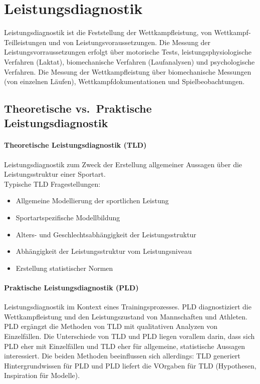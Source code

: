 \section{Leistungsdiagnostik}
Leistungsdiagnostik ist die Feststellung der Wettkampfleistung, von Wettkampf-Teilleistungen und von Leistungsvoraussetzungen.
Die Messung der Leistungsvorraussetzungen erfolgt über motorische Tests, leistungsphysiologische Verfahren (Laktat), biomechanische Verfahren (Laufanalysen) und psychologische Verfahren.
Die Messung der Wettkampfleistung über biomechanische Messungen (von einzelnen Läufen), Wettkampfdokumentationen und Spielbeobachtungen.

\subsection{Theoretische vs.\ Praktische Leistungsdiagnostik}
\paragraph{Theoretische Leistungsdiagnostik (TLD)}
Leistungsdiagnostik zum Zweck der Erstellung allgemeiner Aussagen über die Leistungsstruktur einer Sportart.\\
Typische TLD Fragestellungen:
\begin{itemize}
  \item Allgemeine Modellierung der sportlichen Leistung
  \item Sportartspezifische Modellbildung
  \item Alters- und Geschlechtsabhängigkeit der Leistungsstruktur
  \item Abhängigkeit der Leistungsstruktur vom Leistungsniveau
  \item Erstellung statistischer Normen
\end{itemize}
\paragraph{Praktische Leistungsdiagnostik (PLD)}
Leistungsdiagnostik im Kontext eines Trainingsprozesses.
PLD diagnostiziert die Wettkampfleistung und den Leistungszustand von Mannschaften und Athleten.
PLD ergängzt die Methoden von TLD mit qualitativen Analyzen von Einzelfällen.
Die Unterschiede von TLD und PLD liegen vorallem darin, dass sich PLD eher mit Einzelfällen und TLD eher für allgemeine, statistische Aussagen interessiert.
Die beiden Methoden beeinflussen sich allerdings: TLD generiert Hintergrundwissen für PLD und PLD liefert die VOrgaben für TLD (Hypothesen, Inspiration für Modelle).

